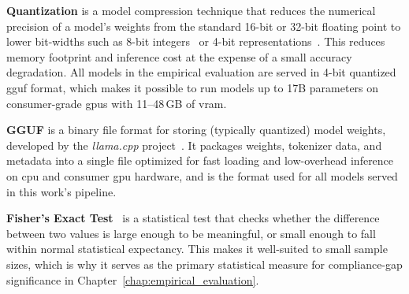 \textbf{Quantization} is a model compression technique that reduces the numerical precision of a model's weights from the standard 16-bit or 32-bit floating point to lower bit-widths such as 8-bit integers~\cite{dettmers2022llmint8} or 4-bit representations~\cite{dettmers2023qlora, frantar2023gptq}. This reduces memory footprint and inference cost at the expense of a small accuracy degradation. All models in the empirical evaluation are served in 4-bit quantized \gls{gguf} format, which makes it possible to run models up to 17B parameters on consumer-grade \glspl{gpu} with 11--48\,GB of \gls{vram}.

\textbf{GGUF} is a binary file format for storing (typically quantized) model weights, developed by the \textit{llama.cpp} project~\cite{gerganov2023llamacpp}. It packages weights, tokenizer data, and metadata into a single file optimized for fast loading and low-overhead inference on \gls{cpu} and consumer \gls{gpu} hardware, and is the format used for all models served in this work's pipeline.

\textbf{Fisher's Exact Test}~\cite{fisher1935design} is a statistical test that checks whether the difference between two values is large enough to be meaningful, or small enough to fall within normal statistical expectancy. This makes it well-suited to small sample sizes, which is why it serves as the primary statistical measure for compliance-gap significance in Chapter~\ref{chap:empirical_evaluation}.


